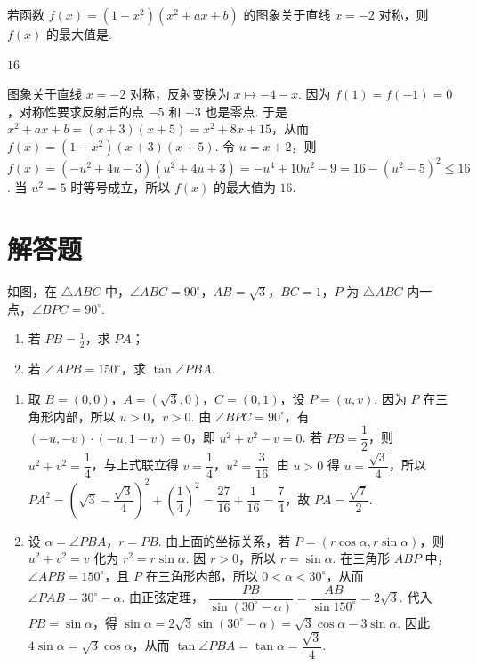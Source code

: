 \begin{problem}
若函数 \( f(x) = \left(1 - x^2\right)\left(x^2 + ax + b\right) \) 的图象关于直线 \( x = -2 \) 对称，则 \( f(x) \) 的最大值是\fillinblank{}.
\end{problem}

\begin{answer}
\(16\)
\end{answer}

\begin{solution}
图象关于直线 \(x=-2\) 对称，反射变换为 \(x\mapsto-4-x\). 因为 \(f(1)=f(-1)=0\)，对称性要求反射后的点 \(-5\) 和 \(-3\) 也是零点. 于是 \(x^2+ax+b=(x+3)(x+5)=x^2+8x+15\)，从而
\(f(x)=(1-x^2)(x+3)(x+5)\). 令 \(u=x+2\)，则 \(f(x)=(-u^2+4u-3)(u^2+4u+3)=-u^4+10u^2-9=16-(u^2-5)^2\leqslant16\). 当 \(u^2=5\) 时等号成立，所以 \(f(x)\) 的最大值为 \(16\).
\end{solution}

\section{解答题}

\begin{problem}
如图，在 \(\triangle ABC\) 中，\(\angle ABC = 90^{\circ}\)，\(AB = \sqrt{3}\)，\(BC = 1\)，\(P\) 为 \(\triangle ABC\) 内一点，\(\angle BPC = 90^{\circ}\).

\begin{enumerate}
\item 若 \(PB = \frac{1}{2}\)，求 \(PA\)；
\item 若 \(\angle APB = 150^{\circ}\)，求 \(\tan \angle PBA\).
\end{enumerate}

\end{problem}

\begin{solution}
\begin{enumerate}
\item 取 \(B=(0,0)\)，\(A=(\sqrt3,0)\)，\(C=(0,1)\)，设 \(P=(u,v)\). 因为 \(P\) 在三角形内部，所以 \(u>0\)，\(v>0\). 由 \(\angle BPC=90^\circ\)，有
\((-u,-v)\cdot(-u,1-v)=0\)，即 \(u^2+v^2-v=0\). 若 \(PB=\dfrac12\)，则 \(u^2+v^2=\dfrac14\)，与上式联立得 \(v=\dfrac14\)，\(u^2=\dfrac{3}{16}\). 由 \(u>0\) 得 \(u=\dfrac{\sqrt3}{4}\)，所以
\(PA^2=\left(\sqrt3-\dfrac{\sqrt3}{4}\right)^2+\left(\dfrac14\right)^2=\dfrac{27}{16}+\dfrac1{16}=\dfrac74\)，故 \(PA=\dfrac{\sqrt7}{2}\).

\item 设 \(\alpha=\angle PBA\)，\(r=PB\). 由上面的坐标关系，若 \(P=(r\cos\alpha,r\sin\alpha)\)，则 \(u^2+v^2=v\) 化为 \(r^2=r\sin\alpha\). 因 \(r>0\)，所以 \(r=\sin\alpha\). 在三角形 \(ABP\) 中，\(\angle APB=150^\circ\)，且 \(P\) 在三角形内部，所以 \(0<\alpha<30^\circ\)，从而 \(\angle PAB=30^\circ-\alpha\). 由正弦定理，
\(\dfrac{PB}{\sin(30^\circ-\alpha)}=\dfrac{AB}{\sin150^\circ}=2\sqrt3\). 代入 \(PB=\sin\alpha\)，得
\(\sin\alpha=2\sqrt3\sin(30^\circ-\alpha)=\sqrt3\cos\alpha-3\sin\alpha\). 因此 \(4\sin\alpha=\sqrt3\cos\alpha\)，从而 \(\tan\angle PBA=\tan\alpha=\dfrac{\sqrt3}{4}\).
\end{enumerate}
\end{solution}

